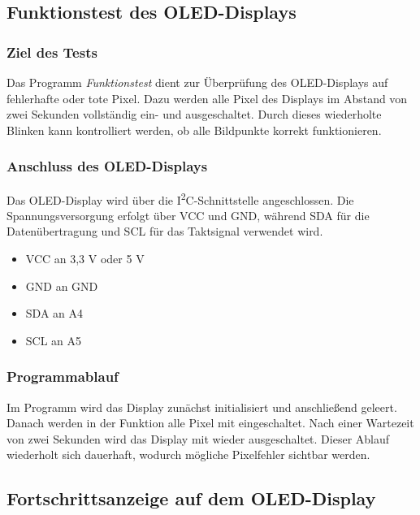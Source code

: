 \subsection{Funktionstest des OLED-Displays}

\subsubsection{Ziel des Tests}

Das Programm \textit{Funktionstest} dient zur Überprüfung des OLED-Displays auf fehlerhafte oder tote Pixel. Dazu werden alle Pixel des Displays im Abstand von zwei Sekunden vollständig ein- und ausgeschaltet. Durch dieses wiederholte Blinken kann kontrolliert werden, ob alle Bildpunkte korrekt funktionieren.

\subsubsection{Anschluss des OLED-Displays}

Das OLED-Display wird über die I\textsuperscript{2}C-Schnittstelle angeschlossen. Die Spannungsversorgung erfolgt über VCC und GND, während SDA für die Datenübertragung und SCL für das Taktsignal verwendet wird.

\begin{itemize}
	\item VCC an 3,3 V oder 5 V
	\item GND an GND
	\item SDA an A4
	\item SCL an A5
\end{itemize}

\subsubsection{Programmablauf}

Im Programm wird das Display zunächst initialisiert und anschließend geleert. Danach werden in der Funktion  alle Pixel mit  eingeschaltet. Nach einer Wartezeit von zwei Sekunden wird das Display mit  wieder ausgeschaltet. Dieser Ablauf wiederholt sich dauerhaft, wodurch mögliche Pixelfehler sichtbar werden.

{
	\label{Code:Test:File:TestOLEDDisplay}
}


\subsection{Fortschrittsanzeige auf dem OLED-Display}

